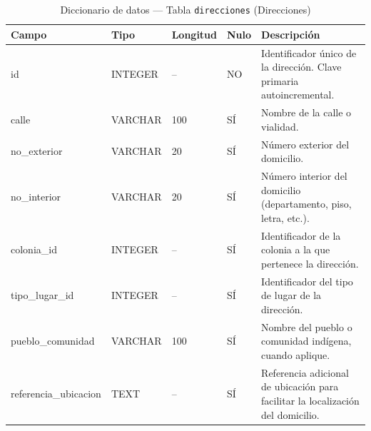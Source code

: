 \begin{table}[H]
	\centering
	\caption{Diccionario de datos --- Tabla \texttt{direcciones} (Direcciones)}
	\label{tab:data-dict-direcciones}
	\scriptsize
	\begin{tabular}{>{\ttfamily\raggedright\arraybackslash}p{3.6cm} p{1.6cm} p{1.3cm} p{0.7cm} p{5.6cm}}
		\toprule
		\textbf{Campo} & \textbf{Tipo} & \textbf{Longitud} & \textbf{Nulo} & \textbf{Descripción} \\
		\midrule
		id & INTEGER & -- & NO & Identificador único de la dirección. Clave primaria autoincremental. \\
		calle & VARCHAR & 100 & SÍ & Nombre de la calle o vialidad. \\
		no\_exterior & VARCHAR & 20 & SÍ & Número exterior del domicilio. \\
		no\_interior & VARCHAR & 20 & SÍ & Número interior del domicilio (departamento, piso, letra, etc.). \\
		colonia\_id & INTEGER & -- & SÍ & Identificador de la colonia a la que pertenece la dirección. \\
		tipo\_lugar\_id & INTEGER & -- & SÍ & Identificador del tipo de lugar de la dirección. \\
		pueblo\_comunidad & VARCHAR & 100 & SÍ & Nombre del pueblo o comunidad indígena, cuando aplique. \\
		referencia\_ubicacion & TEXT & -- & SÍ & Referencia adicional de ubicación para facilitar la localización del domicilio. \\
		\bottomrule
	\end{tabular}
\end{table}

